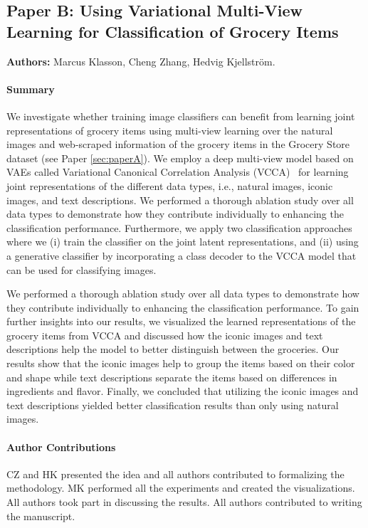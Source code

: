 \subsection{Paper B: Using Variational Multi-View Learning for Classification of Grocery Items}
\label{sec:paperB}

\textbf{Authors:} Marcus Klasson, Cheng Zhang, Hedvig Kjellström. 

\paragraph{Summary} 
We investigate whether training image classifiers can benefit from learning joint representations of grocery items using multi-view learning over the natural images and web-scraped information of the grocery items in the Grocery Store dataset (see Paper \ref{sec:paperA}). We employ a deep multi-view model based on VAEs called Variational Canonical Correlation Analysis (VCCA)~\cite{wang2016deep} for learning joint representations of the different data types, i.e., natural images, iconic images, and text descriptions. We performed a thorough ablation study over all data types to demonstrate how they contribute individually to enhancing the classification performance. Furthermore, we apply two classification approaches where we (i) train the classifier on the joint latent representations, and (ii) using a generative classifier by incorporating a class decoder to the VCCA model that can be used for classifying images. 

We performed a thorough ablation study over all data types to demonstrate how they contribute individually to enhancing the classification performance. To gain further insights into our results, we visualized the learned representations of the grocery items from VCCA and discussed how the iconic images and text descriptions help the model to better distinguish between the groceries. Our results show that the iconic images help to group the items based on their color and shape while text descriptions separate the items based on differences in ingredients and flavor. Finally, we concluded that utilizing the iconic images and text descriptions yielded better classification results than only using natural images. 


\paragraph{Author Contributions} 
CZ and HK presented the idea and all authors contributed to formalizing the methodology. 
MK performed all the experiments and created the visualizations. 
All authors took part in discussing the results.
All authors contributed to writing the manuscript. 


